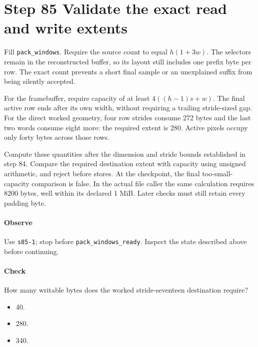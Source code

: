 \section{Step 85 Validate the exact read and write extents}
Fill \texttt{pack\_windows}. Require the source count to equal $h(1+3w)$. The selectors remain in the reconstructed buffer, so its layout still includes one prefix byte per row. The exact count prevents a short final sample or an unexplained suffix from being silently accepted.

For the framebuffer, require capacity of at least $4((h-1)s+w)$. The final active row ends after its own width, without requiring a trailing stride-sized gap. For the direct worked geometry, four row strides consume 272 bytes and the last two words consume eight more: the required extent is 280. Active pixels occupy only forty bytes across those rows.

Compute these quantities after the dimension and stride bounds established in step 84. Compare the required destination extent with capacity using unsigned arithmetic, and reject before stores. At the checkpoint, the final too-small-capacity comparison is false. In the actual file caller the same calculation requires 8200 bytes, well within its declared 1 MiB. Later checks must still retain every padding byte.

\paragraph{Observe} Use \texttt{s85-1}; stop before \texttt{pack\_windows\_ready}. Inspect the state described above before continuing.

\paragraph{Check} How many writable bytes does the worked stride-seventeen destination require?
\begin{itemize}
\item[A.] 40.
\item[B.] 280.
\item[C.] 340.
\end{itemize}
